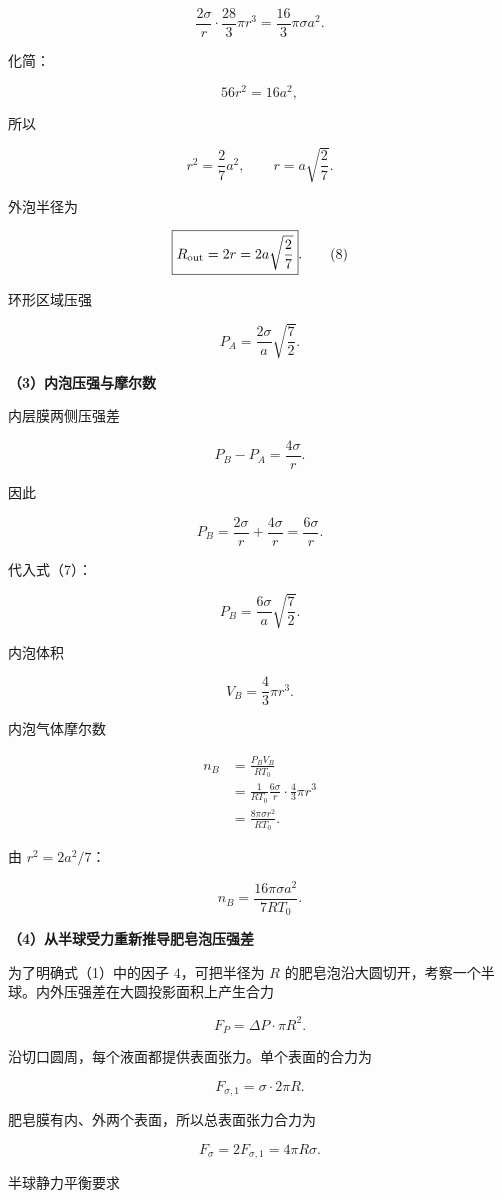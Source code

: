 \documentclass[12pt,a4paper,UTF8]{ctexart}
\begin{document}
\[
\frac{2\sigma}{r}
\cdot\frac{28}{3}\pi r^3
=\frac{16}{3}\pi\sigma a^2.
\]

化简：

\[
56r^2=16a^2,
\]

所以

\[
r^2=\frac27a^2,
\qquad
r=a\sqrt{\frac27}.
\tag{7}
\]

外泡半径为

\[
\boxed{
R_{\rm out}=2r
=2a\sqrt{\frac27}
}.
\tag{8}
\]

环形区域压强

\[
\boxed{
P_A
=\frac{2\sigma}{a}\sqrt{\frac72}
}.
\tag{9}
\]

\textbf{（3）内泡压强与摩尔数}

内层膜两侧压强差

\[
P_B-P_A=\frac{4\sigma}{r}.
\tag{10}
\]

因此

\[
P_B
=\frac{2\sigma}{r}+\frac{4\sigma}{r}
=\frac{6\sigma}{r}.
\]

代入式（7）：

\[
\boxed{
P_B
=\frac{6\sigma}{a}\sqrt{\frac72}
}.
\tag{11}
\]

内泡体积

\[
V_B=\frac43\pi r^3.
\]

内泡气体摩尔数

\[
\begin{aligned}
n_B
&=\frac{P_BV_B}{RT_0}\\
&=\frac1{RT_0}
\frac{6\sigma}{r}\cdot\frac43\pi r^3\\
&=\frac{8\pi\sigma r^2}{RT_0}.
\end{aligned}
\]

由 \(r^2=2a^2/7\)：

\[
\boxed{
n_B
=\frac{16\pi\sigma a^2}{7RT_0}
}.
\tag{12}
\]

\textbf{（4）从半球受力重新推导肥皂泡压强差}

为了明确式（1）中的因子 \(4\)，可把半径为 \(R\)
的肥皂泡沿大圆切开，考察一个半球。内外压强差在大圆投影面积上产生合力

\[
F_P=\Delta P\cdot\pi R^2.
\tag{13}
\]

沿切口圆周，每个液面都提供表面张力。单个表面的合力为

\[
F_{\sigma,1}=\sigma\cdot2\pi R.
\]

肥皂膜有内、外两个表面，所以总表面张力合力为

\[
F_\sigma=2F_{\sigma,1}=4\pi R\sigma.
\tag{14}
\]

半球静力平衡要求
\end{document}
